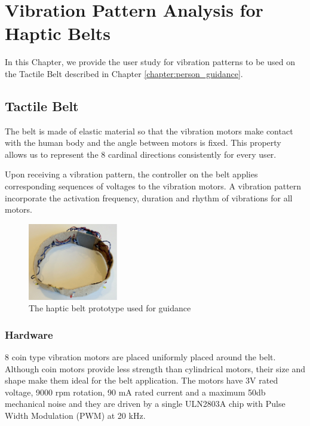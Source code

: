 \chapter{Vibration Pattern Analysis for Haptic Belts}
\label{chapter:vibration_pattern_analysis_for_haptic_belts}

In this Chapter, we provide the user study for vibration patterns to be used on the Tactile Belt described in Chapter \ref{chapter:person_guidance}.


\section{Tactile Belt}
\label{sec:belt}

The belt is made of elastic material so that the vibration motors make contact with the human body and the angle between motors is fixed. This property allows us to represent the 8 cardinal directions consistently for every user.

Upon receiving a vibration pattern, the controller on the belt applies corresponding sequences of voltages to the vibration motors. A vibration pattern incorporate the activation frequency, duration and rhythm of vibrations for all motors.

\begin{figure}[ht!]
\centering
\includegraphics[width=0.35\textwidth]{pics/belt}
\caption{The haptic belt prototype used for guidance}
\label{fig:belt}
\end{figure}

\subsection{Hardware}

8 coin type vibration motors are placed uniformly placed around the belt. Although coin motors provide less strength than cylindrical motors, their size and shape make them ideal for the belt application. The motors have 3V rated voltage, 9000 rpm rotation, 90 mA rated current and a maximum 50db mechanical noise and they are driven by a single ULN2803A chip with Pulse Width Modulation (PWM) at 20 kHz.

